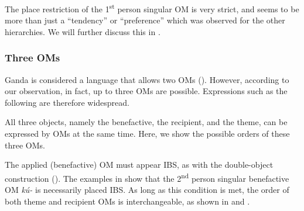 \documentclass[output=paper,
            colorlinks, citecolor=brown
            ,draftmode
		  ]{langscibook}
\begin{document}
\ea%
    \label{ex:yoneda:48}
    \z
\z

The place restriction of the 1\textsuperscript{st} person singular OM is very strict, and seems to be more than just a ``tendency'' or ``preference'' which was observed for the other hierarchies. We will further discuss this in . 

\subsubsection{Three OMs}  
\label{sec:yoneda:4.2.2}

Ganda is considered a language that allows two OMs (\citealt{Ssekiryango2006, Marlo2015}). However, according to our observation, in fact, up to three OMs are possible. Expressions such as the following are therefore widespread.


\ea%
    \label{ex:yoneda:49}
    
    \z
\z

    All three objects, namely the benefactive, the recipient, and the theme, can be expressed by OMs at the same time. Here, we show the possible orders of these three OMs.


The applied (benefactive) OM must appear IBS, as with the double-object construction (). The examples in  show that the 2\textsuperscript{nd} person singular benefactive OM \textit{kú-} is necessarily placed IBS. As long as this condition is met, the order of both theme and recipient OMs is interchangeable, as shown in  and . 
\end{document}
